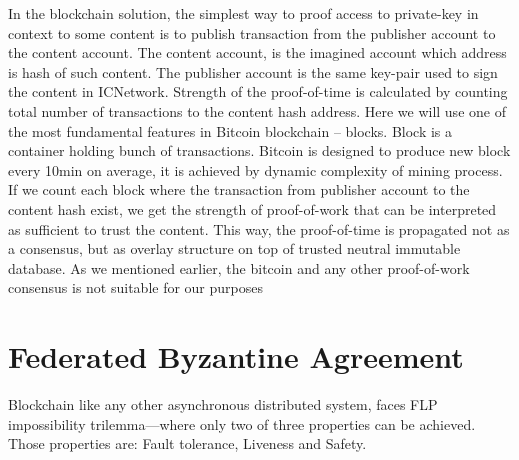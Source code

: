 \documentclass[nostrict]{szablonPG}
\begin{document}
In the blockchain solution, the simplest way to proof access to private-key in context to some content is to publish transaction from the publisher account to the content account. The content account, is the imagined account which address is hash of such content. The publisher account is the same key-pair used to sign the content in ICNetwork. Strength of the proof-of-time is calculated by counting total number of transactions to the content hash address. Here we will use one of the most fundamental features in Bitcoin blockchain -- blocks. Block is a container holding bunch of transactions. Bitcoin is designed to produce new block every 10min on average, it is achieved by dynamic complexity of mining process. If we count each block where the transaction from publisher account to the content hash exist, we get the strength of proof-of-work that can be interpreted as sufficient to trust the content. This way, the proof-of-time is propagated not as a consensus, but as overlay structure on top of trusted neutral immutable database. 
As we mentioned earlier, the bitcoin and any other proof-of-work consensus is not suitable for our purposes


\section{Federated Byzantine Agreement}
Blockchain like any other asynchronous distributed system, faces FLP\cite{fischer1985impossibility} impossibility trilemma---where only two of three properties can be achieved. Those properties are: Fault tolerance, Liveness and Safety.
\end{document}
